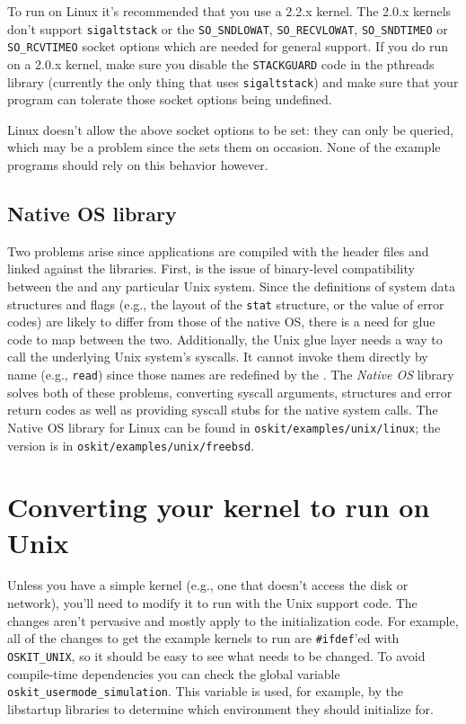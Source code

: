 To run on Linux it's recommended that you use a 2.2.x kernel.  The
2.0.x kernels don't support {\tt sigaltstack} or the 
{\tt SO_SNDLOWAT}, {\tt SO_RECVLOWAT}, {\tt SO_SNDTIMEO} or 
{\tt SO_RCVTIMEO} socket options which are needed for general \oskit{}
support.  If you do run on a 2.0.x kernel, make sure you disable the
{\tt STACKGUARD} code in the pthreads library (currently the only
thing that uses {\tt sigaltstack}) and make sure that your \oskit{}
program can tolerate those socket options being undefined.

Linux doesn't allow the above socket options to be set: they can only
be queried, which may be a problem since the \oskit{} sets them
on occasion.
None of the example programs should rely on this behavior however.


\subsection{Native OS library}
\label{sec:nativeos}

Two problems arise since applications are compiled with the \oskit{}
header files and linked against the \oskit{} libraries.  First, is
the issue of binary-level compatibility between the \oskit{} and any
particular Unix system.  Since the \oskit{} definitions of system data
structures and flags (e.g., the layout of the {\tt stat} structure, or
the value of error codes) are likely to differ from those of the native OS,
there is a need for glue code to map between the two.  Additionally,
the Unix glue layer needs a way to call the underlying Unix system's syscalls.
It cannot invoke them directly by name (e.g., {\tt read}) since those names
are redefined by the \oskit{}.  The \emph{Native OS} library solves both
of these problems, converting syscall arguments, structures and error
return codes as well as providing syscall stubs for the native system calls.
The Native OS library for Linux can be found in
{\tt oskit/examples/unix/linux}; the \freebsd{} version is in
{\tt oskit/examples/unix/freebsd}.


\section{Converting your \oskit{} kernel to run on Unix}

Unless you have a simple \oskit{} kernel (e.g., one that doesn't access the
disk or network), you'll need to modify it to run with
the Unix support code.  The changes aren't pervasive and mostly apply
to the initialization code.  For example, all of the changes to get the
example kernels to run are {\tt \#ifdef}'ed with {\tt OSKIT_UNIX}, so it
should be easy to see what needs to be changed.  To avoid compile-time 
dependencies you can check the global variable {\tt
  oskit_usermode_simulation}.  This variable is used, for example, by
the libstartup libraries to determine which environment they should
initialize for.

